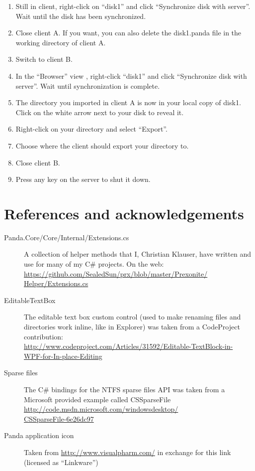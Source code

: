 \documentclass[a4paper,12pt]{article}
\begin{document}
\begin{enumerate}
\item Still in client, right-click on ``disk1'' and click ``Synchronize disk with server''. Wait until the disk has been synchronized.
\item Close client A. If you want, you can also delete the disk1.panda file in the working directory of client A.
\item Switch to client B.
\item In the ``Browser'' view , right-click ``disk1'' and click ``Synchronize disk with server''. Wait until synchronization is complete.
\item The directory you imported in client A is now in your local copy of disk1. Click on the white arrow next to your disk to reveal it.
\item Right-click on your directory and select ``Export''.
\item Choose where the client should export your directory to.
\item Close client B.
\item Press any key on the server to shut it down.
\end{enumerate}

\section{References and acknowledgements}
\begin{description}
\item[Panda.Core/Core/Internal/Extensions.cs] A collection of helper methods that I, Christian Klauser, have written and use for many of my C\# projects.
On the web: \\ \href{https://github.com/SealedSun/prx/blob/master/Prexonite/Helper/Extensions.cs}{https://github.com/SealedSun/prx/blob/master/Prexonite/\\{}Helper/Extensions.cs}
\item[EditableTextBox] The editable text box custom control (used to make renaming files and directories work inline, like in Explorer) was taken from a CodeProject contribution: \\ \href{http://www.codeproject.com/Articles/31592/Editable-TextBlock-in-WPF-for-In-place-Editing}{http://www.codeproject.com/Articles/31592/Editable-TextBlock-in-\\{}WPF-for-In-place-Editing}
\item[Sparse files] The C\# bindings for the NTFS sparse files API was taken from a Microsoft provided example called CSSparseFile \\
\href{http://code.msdn.microsoft.com/windowsdesktop/CSSparseFile-6e26dc97}{http://code.msdn.microsoft.com/windowsdesktop/\\{}CSSparseFile-6e26dc97}
\item[Panda application icon] Taken from \href{http://www.visualpharm.com/}{http://www.visualpharm.com/} in exchange for this link (licensed as ``Linkware'')

\end{description}
\end{document}
